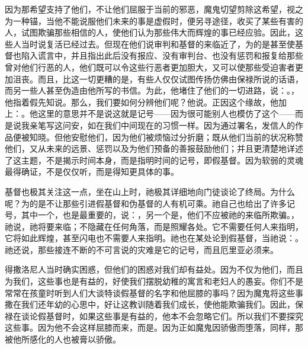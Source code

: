 因为那希望支持了他们，不让他们屈服于当前的邪恶，魔鬼切望剪除这希望，视之为一种锚，当他不能说服他们未来的事是虚假时，便另寻途径，收买了某些有害的人，试图欺骗那些相信的人，使他们认为那些伟大而辉煌的事已经应验。因此，这些人当时说复活已经过去。但现在他们说审判和基督的来临近了，为的是甚至使基督也陷入谎言中，并且指出此后没有报应、没有审判台、也没有惩罚和报复给那些曾对他们行恶的人，他们既可以令这些行恶者更加胆大，又可以使那些受迫害者更加沮丧。而且，比这一切更糟的是，有些人仅仅试图传扬仿佛由保禄所说的话语，而另一些人甚至伪造由他所写的书信。为此，他堵住了他们的一切进路，说：。，他指着假先知说。那么，我们要如何分辨他们呢？他说。正因这个缘故，他加上：。他这里的意思并不是说这就是记号——因为很可能别人也模仿了这个——而是说我亲笔写这问安，如在我们中间现在的习惯一样。因为通过署名，发信人的作品便被知晓。但他安慰他们，因为他们被烦恼过分折磨；既从他们当前的状况称赞他们，又从未来的远景、惩罚以及为他们预备的善报鼓励他们；并且更清楚地详述了这主题，不是揭示时间本身，而是指明时间的记号，即假基督。因为软弱的灵魂最得确证，不是仅仅听，而是得知更具体的事。\par

基督也极其关注这一点，坐在山上时，祂极其详细地向门徒谈论了终局。为什么呢？为的是不让那些引进假基督和伪基督的人有机可乘。祂自己也给出了许多记号，其中一个，也是最重要的，说：，另一个是，他们不应被祂的来临所欺骗。，祂说，祂将要来临；不隐藏在任何角落，而是照耀各处。它不需要任何人来指明，它将如此辉煌，甚至闪电也不需要人来指明。祂也在某处论到假基督，当祂说：。祂还说，那些接连不断的不可言说的灾难是它的记号，而且厄里亚必须来。\par

得撒洛尼人当时确实困惑，但他们的困惑对我们却有益处。因为不仅为他们，而且为我们，这些事也是有益的，好使我们摆脱幼稚的寓言和老妇人的愚妄。你们不是常常在孩童时听到人们大谈特谈假基督的名字和他屈膝的事吗？因为魔鬼将这些事撒在我们还年幼的心思中，好让这教训随着我们成长，使他能欺骗我们。因此，保禄在谈论假基督时，如果这些事是有益的，他本不会忽略它们。所以我们不要探究这些事。因为他不会这样屈膝而来，而是。因为正如魔鬼因骄傲而堕落，同样，那被他所感化的人也被膏以骄傲。\par

